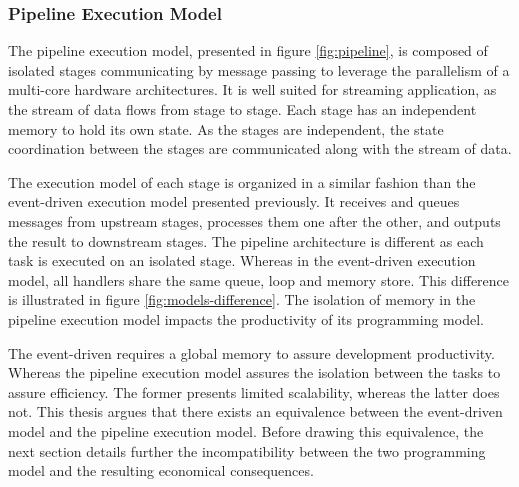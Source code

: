 \subsubsection{Pipeline Execution Model}

The pipeline execution model, presented in figure \ref{fig:pipeline}, is composed of isolated stages communicating by message passing to leverage the parallelism of a multi-core hardware architectures.
It is well suited for streaming application, as the stream of data flows from stage to stage.
Each stage has an independent memory to hold its own state.
As the stages are independent, the state coordination between the stages are communicated along with the stream of data.

\begin{figure}[h!]
\end{figure}

The execution model of each stage is organized in a similar fashion than the event-driven execution model presented previously.
It receives and queues messages from upstream stages, processes them one after the other, and outputs the result to downstream stages.
The pipeline architecture is different as each task is executed on an isolated stage.
Whereas in the event-driven execution model, all handlers share the same queue, loop and memory store.
This difference is illustrated in figure \ref{fig:models-difference}.
The isolation of memory in the pipeline execution model impacts the productivity of its programming model.

The event-driven requires a global memory to assure development productivity.
Whereas the pipeline execution model assures the isolation between the tasks to assure efficiency.
The former presents limited scalability, whereas the latter does not.
This thesis argues that there exists an equivalence between the event-driven model and the pipeline execution model.
Before drawing this equivalence, the next section details further the incompatibility between the two programming model and the resulting economical consequences.

